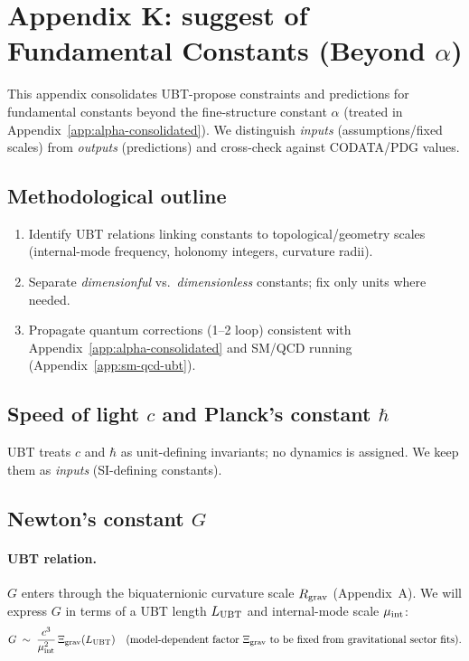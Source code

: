 \section{Appendix K: suggest of Fundamental Constants (Beyond $\alpha$)}
\label{app:fundamental-constants}

This appendix consolidates UBT-propose constraints and predictions for fundamental constants beyond the fine-structure constant $\alpha$ (treated in Appendix~\ref{app:alpha-consolidated}). We distinguish \emph{inputs} (assumptions/fixed scales) from \emph{outputs} (predictions) and cross-check against CODATA/PDG values.

\subsection{Methodological outline}
\begin{enumerate}
\item Identify UBT relations linking constants to topological/geometry scales (internal-mode frequency, holonomy integers, curvature radii).
\item Separate \emph{dimensionful} vs.\ \emph{dimensionless} constants; fix only units where needed.
\item Propagate quantum corrections (1–2 loop) consistent with Appendix~\ref{app:alpha-consolidated} and SM/QCD running (Appendix~\ref{app:sm-qcd-ubt}).
\end{enumerate}

\subsection{Speed of light $c$ and Planck's constant $\hbar$}
UBT treats $c$ and $\hbar$ as unit-defining invariants; no dynamics is assigned. We keep them as \emph{inputs} (SI-defining constants).

\subsection{Newton's constant $G$}
\paragraph{UBT relation.} $G$ enters through the biquaternionic curvature scale $R_{\rm grav}$ (Appendix~A). We will express $G$ in terms of a UBT length $L_{\rm UBT}$ and internal-mode scale $\mu_{\rm int}$:
\begin{equation}
G \;\sim\; \frac{c^3}{\mu_{\rm int}^2}\,\Xi_{\rm grav}(L_{\rm UBT}) \quad\text{(model-dependent factor $\Xi_{\rm grav}$ to be fixed from gravitational sector fits).}
\end{equation}

